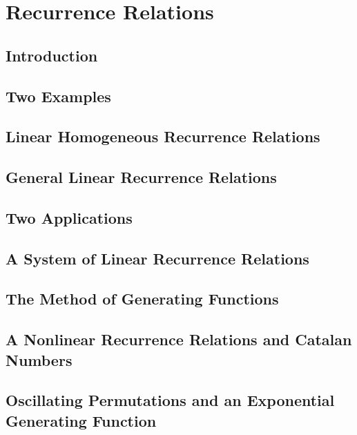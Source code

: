 \section{Recurrence Relations}
\subsection{Introduction}
\subsection{Two Examples}
\subsection{Linear Homogeneous Recurrence Relations}
\subsection{General Linear Recurrence Relations}
\subsection{Two Applications}
\subsection{A System of Linear Recurrence Relations}
\subsection{The Method of Generating Functions}
\subsection{A Nonlinear Recurrence Relations and Catalan Numbers}
\subsection{Oscillating Permutations and an Exponential Generating Function}
